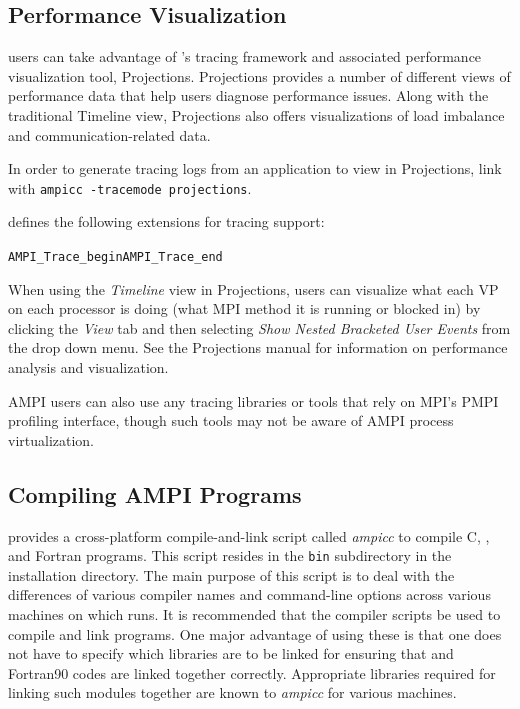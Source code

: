 \documentclass[10pt]{article}
\begin{document}
\subsection{Performance Visualization}
\ampi{} users can take advantage of \charmpp{}'s tracing framework and
associated performance visualization tool, Projections. Projections
provides a number of different views of performance data that help
users diagnose performance issues. Along with the traditional Timeline view,
Projections also offers visualizations of load imbalance and communication-related data.

In order to generate tracing logs from an application to view in Projections,
link with \texttt{ampicc -tracemode projections}.

\ampi{} defines the following extensions for tracing support:

\begin{alltt}
AMPI_Trace_begin                      AMPI_Trace_end
\end{alltt}

When using the \emph{Timeline} view in Projections, \ampi{} users can visualize
what each VP on each processor is doing (what MPI method it is running or blocked in)
by clicking the \emph{View} tab and then selecting \emph{Show Nested Bracketed User Events}
from the drop down menu.
See the Projections manual for information on performance analysis and visualization.

AMPI users can also use any tracing libraries or tools that rely on MPI's PMPI profiling interface,
though such tools may not be aware of AMPI process virtualization.

\subsection{Compiling AMPI Programs}

\ampi{} provides a cross-platform compile-and-link script called \emph{ampicc}
to compile C, \CC{}, and Fortran \ampi{} programs.  This script
resides in the \texttt{bin} subdirectory in the \charmpp{} installation
directory. The main purpose of this script is to deal with the differences of
various compiler names and command-line options across various machines on
which \ampi{} runs. It is recommended that the \ampi{} compiler
scripts be used to compile and link \ampi{} programs. One major advantage of
using these is that one does not have to specify which libraries are to be
linked for ensuring that \CC{} and Fortran90 codes are linked together
correctly. Appropriate libraries required for linking such modules together
are known to \emph{ampicc} for various machines.
\end{document}
